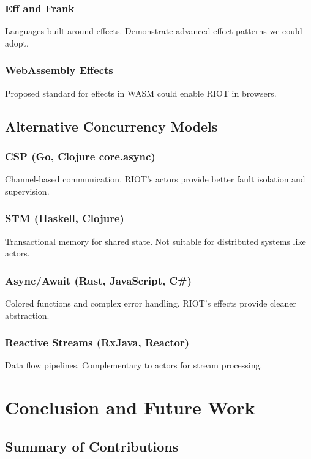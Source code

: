 \documentclass[12pt,a4paper]{report}
\begin{document}
\subsection{Eff and Frank}
Languages built around effects. Demonstrate advanced effect patterns we could adopt.

\subsection{WebAssembly Effects}
Proposed standard for effects in WASM could enable RIOT in browsers.

\section{Alternative Concurrency Models}

\subsection{CSP (Go, Clojure core.async)}
Channel-based communication. RIOT's actors provide better fault isolation and supervision.

\subsection{STM (Haskell, Clojure)}
Transactional memory for shared state. Not suitable for distributed systems like actors.

\subsection{Async/Await (Rust, JavaScript, C\#)}
Colored functions and complex error handling. RIOT's effects provide cleaner abstraction.

\subsection{Reactive Streams (RxJava, Reactor)}
Data flow pipelines. Complementary to actors for stream processing.

\chapter{Conclusion and Future Work}

\section{Summary of Contributions}
\end{document}

